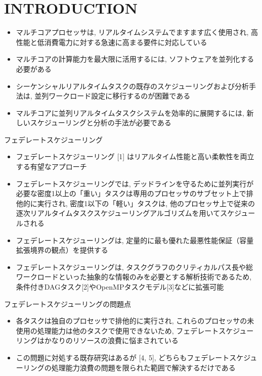 
\section{INTRODUCTION}
\label{sec: introduction}

\begin{frame}{}
    \begin{itemize}
        \item マルチコアプロセッサは, リアルタイムシステムでますます広く使用され, 高性能と低消費電力に対する急速に高まる要件に対応している
        \item マルチコアの計算能力を最大限に活用するには, ソフトウェアを並列化する必要がある
        \item シーケンシャルリアルタイムタスクの既存のスケジューリングおよび分析手法は, 並列ワークロード設定に移行するのが困難である
        \item マルチコアに並列リアルタイムタスクシステムを効率的に展開するには, 新しいスケジューリングと分析の手法が必要である
    \end{itemize}
\end{frame}

\begin{frame}{フェデレートスケジューリング}
    \begin{itemize}
        \item フェデレートスケジューリング [1] はリアルタイム性能と高い柔軟性を両立する有望なアプローチ
        \item フェデレートスケジューリングでは, デッドラインを守るために並列実行が必要な密度1以上の「重い」タスクは専用のプロセッサのサブセット上で排他的に実行され, 密度1以下の「軽い」タスクは, 他のプロセッサ上で従来の逐次リアルタイムタスクスケジューリングアルゴリズムを用いてスケジュールされる
        \item フェデレートスケジューリングは, 定量的に最も優れた最悪性能保証（容量拡張境界の観点）を提供する
        \item フェデレートスケジューリングは, タスクグラフのクリティカルパス長や総ワークロードといった抽象的な情報のみを必要とする解析技術であるため, 条件付きDAGタスク[2]やOpenMPタスクモデル[3]などに拡張可能
    \end{itemize}
\end{frame}

\begin{frame}{フェデレートスケジューリングの問題点}
    \begin{itemize}
        \item 各タスクは独自のプロセッサで排他的に実行され, これらのプロセッサの未使用の処理能力は他のタスクで使用できないため, フェデレートスケジューリングはかなりのリソースの浪費に悩まされている
        \item この問題に対処する既存研究はあるが [4, 5], どちらもフェデレートスケジューリングの処理能力浪費の問題を限られた範囲で解決するだけである
    \end{itemize}
\end{frame}

